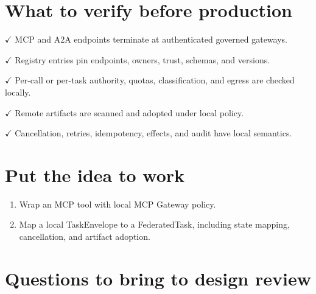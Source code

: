 \section{What to verify before production}

\textbf{\ensuremath{\checkmark}} MCP and A2A endpoints terminate at authenticated governed gateways.\par

\textbf{\ensuremath{\checkmark}} Registry entries pin endpoints, owners, trust, schemas, and versions.\par

\textbf{\ensuremath{\checkmark}} Per-call or per-task authority, quotas, classification, and egress are checked locally.\par

\textbf{\ensuremath{\checkmark}} Remote artifacts are scanned and adopted under local policy.\par

\textbf{\ensuremath{\checkmark}} Cancellation, retries, idempotency, effects, and audit have local semantics.\par

\section{Put the idea to work}

\begin{enumerate}

\item Wrap an MCP tool with local MCP Gateway policy.

\item Map a local TaskEnvelope to a FederatedTask, including state mapping, cancellation, and artifact adoption.

\end{enumerate}

\section{Questions to bring to design review}

